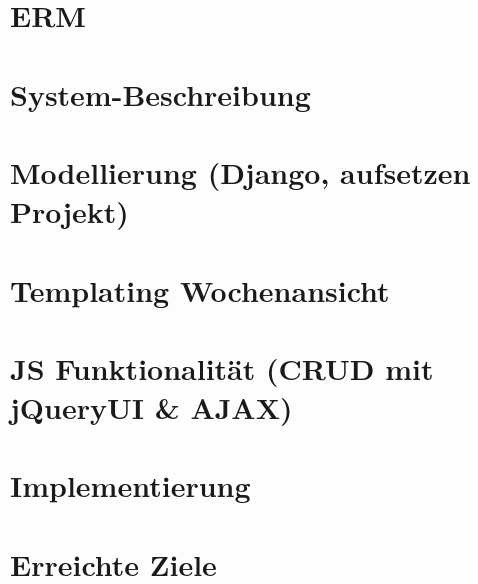 \section{ERM}
\section{System-Beschreibung}
\section{Modellierung (Django, aufsetzen Projekt) }
\section{Templating Wochenansicht}
\section{JS Funktionalität (CRUD mit jQueryUI \& AJAX) }
\section{Implementierung}
\section{Erreichte Ziele}
